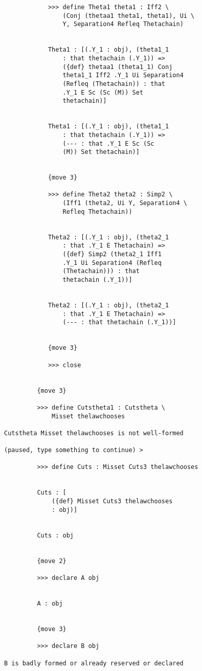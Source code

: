 \documentclass[12pt]{article}
\begin{document}
\begin{verbatim}
            >>> define Theta1 theta1 : Iff2 \
                (Conj (thetaa1 theta1, theta1), Ui \
                Y, Separation4 Refleq Thetachain)


            Theta1 : [(.Y_1 : obj), (theta1_1 
                : that thetachain (.Y_1)) => 
                ({def} thetaa1 (theta1_1) Conj 
                theta1_1 Iff2 .Y_1 Ui Separation4 
                (Refleq (Thetachain)) : that 
                .Y_1 E Sc (Sc (M)) Set 
                thetachain)]


            Theta1 : [(.Y_1 : obj), (theta1_1 
                : that thetachain (.Y_1)) => 
                (--- : that .Y_1 E Sc (Sc 
                (M)) Set thetachain)]


            {move 3}

            >>> define Theta2 theta2 : Simp2 \
                (Iff1 (theta2, Ui Y, Separation4 \
                Refleq Thetachain))


            Theta2 : [(.Y_1 : obj), (theta2_1 
                : that .Y_1 E Thetachain) => 
                ({def} Simp2 (theta2_1 Iff1 
                .Y_1 Ui Separation4 (Refleq 
                (Thetachain))) : that 
                thetachain (.Y_1))]


            Theta2 : [(.Y_1 : obj), (theta2_1 
                : that .Y_1 E Thetachain) => 
                (--- : that thetachain (.Y_1))]


            {move 3}

            >>> close


         {move 3}

         >>> define Cutstheta1 : Cutstheta \
             Misset thelawchooses

Cutstheta Misset thelawchooses is not well-formed

(paused, type something to continue) >

         >>> define Cuts : Misset Cuts3 thelawchooses


         Cuts : [
             ({def} Misset Cuts3 thelawchooses 
             : obj)]


         Cuts : obj


         {move 2}

         >>> declare A obj


         A : obj


         {move 3}

         >>> declare B obj

B is badly formed or already reserved or declared


\end{verbatim}
\end{document}
